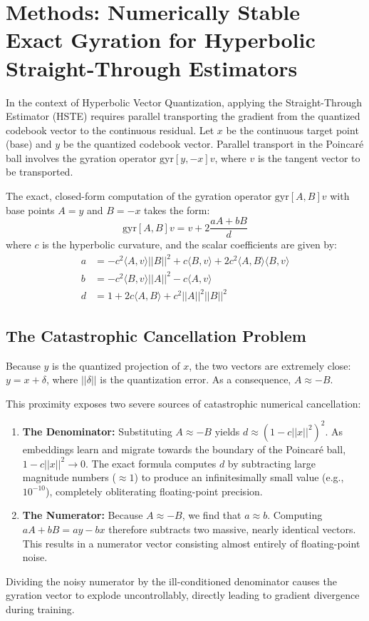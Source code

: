 \documentclass{article}
\begin{document}
\section*{Methods: Numerically Stable Exact Gyration for Hyperbolic Straight-Through Estimators}

In the context of Hyperbolic Vector Quantization, applying the Straight-Through Estimator (HSTE) requires parallel transporting the gradient from the quantized codebook vector to the continuous residual. Let $x$ be the continuous target point (base) and $y$ be the quantized codebook vector. Parallel transport in the Poincaré ball involves the gyration operator $\text{gyr}[y, -x] v$, where $v$ is the tangent vector to be transported.

The exact, closed-form computation of the gyration operator $\text{gyr}[A, B]v$ with base points $A = y$ and $B = -x$ takes the form:
\begin{equation}
    \text{gyr}[A, B]v = v + 2 \frac{a A + b B}{d}
\end{equation}
where $c$ is the hyperbolic curvature, and the scalar coefficients are given by:
\begin{align}
    a &= -c^2 \langle A, v \rangle ||B||^2 + c \langle B, v \rangle + 2 c^2 \langle A, B \rangle \langle B, v \rangle \\
    b &= -c^2 \langle B, v \rangle ||A||^2 - c \langle A, v \rangle \\
    d &= 1 + 2 c \langle A, B \rangle + c^2 ||A||^2 ||B||^2
\end{align}

\subsection*{The Catastrophic Cancellation Problem}
Because $y$ is the quantized projection of $x$, the two vectors are extremely close: $y = x + \delta$, where $||\delta||$ is the quantization error. As a consequence, $A \approx -B$.

This proximity exposes two severe sources of catastrophic numerical cancellation:
\begin{enumerate}
    \item \textbf{The Denominator:} Substituting $A \approx -B$ yields $d \approx (1 - c ||x||^2)^2$. As embeddings learn and migrate towards the boundary of the Poincaré ball, $1 - c||x||^2 \to 0$. The exact formula computes $d$ by subtracting large magnitude numbers ($\approx 1$) to produce an infinitesimally small value (e.g., $10^{-10}$), completely obliterating floating-point precision.
    \item \textbf{The Numerator:} Because $A \approx -B$, we find that $a \approx b$. Computing $a A + b B = a y - b x$ therefore subtracts two massive, nearly identical vectors. This results in a numerator vector consisting almost entirely of floating-point noise.
\end{enumerate}
Dividing the noisy numerator by the ill-conditioned denominator causes the gyration vector to explode uncontrollably, directly leading to gradient divergence during training.
\end{document}
